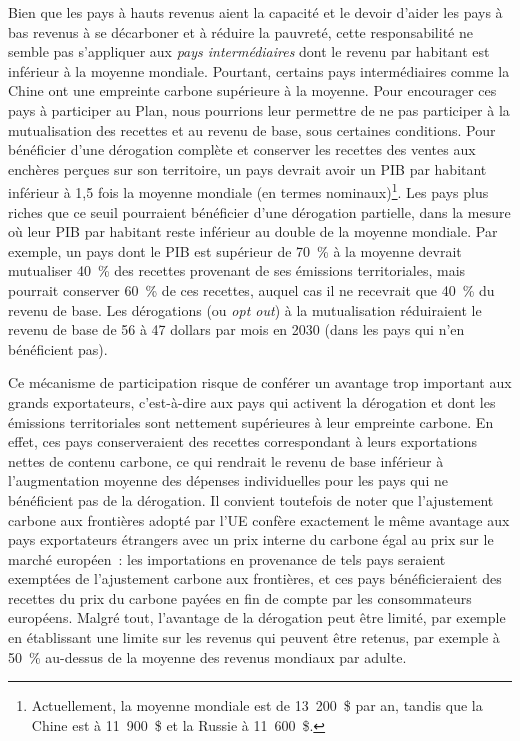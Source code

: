 \documentclass[a5paper,french]{memoir}
\begin{document}
Bien que les pays à hauts revenus aient la capacité et le devoir d'aider les pays à bas revenus à se décarboner et à réduire la pauvreté, cette responsabilité ne semble pas s'appliquer aux \textit{pays intermédiaires} dont le revenu par habitant est inférieur à la moyenne mondiale. Pourtant, certains pays intermédiaires comme la Chine ont une empreinte carbone supérieure à la moyenne. Pour encourager ces pays à participer au Plan, nous pourrions leur permettre de ne pas participer à la mutualisation des recettes et au revenu de base, sous certaines conditions. Pour bénéficier d'une dérogation complète et conserver les recettes des ventes aux enchères perçues sur son territoire, un pays devrait avoir un PIB par habitant inférieur à 1,5 fois la moyenne mondiale (en termes nominaux)\footnote{Actuellement, la moyenne mondiale est de 13~200~\$ par an, tandis que la Chine est à 11~900~\$ et la Russie à 11~600~\$.}. Les pays plus riches que ce seuil pourraient bénéficier d'une dérogation partielle, dans la mesure où leur PIB par habitant reste inférieur au double de la moyenne mondiale. Par exemple, un pays dont le PIB est supérieur de 70~\% à la moyenne devrait mutualiser 40~\% des recettes provenant de ses émissions territoriales, mais pourrait conserver 60~\% de ces recettes, auquel cas il ne recevrait que 40~\% du revenu de base. Les dérogations (ou \textit{opt out}) à la mutualisation réduiraient le revenu de base de 56 à 47 dollars par mois en 2030 (dans les pays qui n'en bénéficient pas). 

Ce mécanisme de participation risque de conférer un avantage trop important aux grands exportateurs, c'est-à-dire aux pays qui activent la dérogation et dont les émissions territoriales sont nettement supérieures à leur empreinte carbone. En effet, ces pays conserveraient des recettes correspondant à leurs exportations nettes de contenu carbone, ce qui rendrait le revenu de base inférieur à l'augmentation moyenne des dépenses individuelles pour les pays qui ne bénéficient pas de la dérogation. Il convient toutefois de noter que l'ajustement carbone aux frontières adopté par l'UE confère exactement le même avantage aux pays exportateurs étrangers avec un prix interne du carbone égal au prix sur le marché européen~: les importations en provenance de tels pays seraient exemptées de l'ajustement carbone aux frontières, et ces pays bénéficieraient des recettes du prix du carbone payées en fin de compte par les consommateurs européens. Malgré tout, l'avantage de la dérogation peut être limité, par exemple en établissant une limite sur les revenus qui peuvent être retenus, par exemple à 50~\% au-dessus de la moyenne des revenus mondiaux par adulte. %
\end{document}
